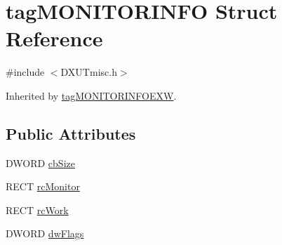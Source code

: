\hypertarget{structtag_m_o_n_i_t_o_r_i_n_f_o}{
\section{tagMONITORINFO Struct Reference}
\label{structtag_m_o_n_i_t_o_r_i_n_f_o}
}


{\ttfamily \#include $<$DXUTmisc.h$>$}

Inherited by \hyperlink{structtag_m_o_n_i_t_o_r_i_n_f_o_e_x_w}{tagMONITORINFOEXW}.\subsection*{Public Attributes}
\begin{DoxyCompactItemize}
\item 
DWORD \hyperlink{structtag_m_o_n_i_t_o_r_i_n_f_o_ae33bcbe159b7f7f4917c0949287acaba}{cbSize}
\item 
RECT \hyperlink{structtag_m_o_n_i_t_o_r_i_n_f_o_a3e7136198a3c55f18014f6b8cc78e37c}{rcMonitor}
\item 
RECT \hyperlink{structtag_m_o_n_i_t_o_r_i_n_f_o_a6b69929d40dcc1715001f2f3140130a5}{rcWork}
\item 
DWORD \hyperlink{structtag_m_o_n_i_t_o_r_i_n_f_o_a7f7a1608179d7bf5b75abc2152fe04de}{dwFlags}
\end{DoxyCompactItemize}


